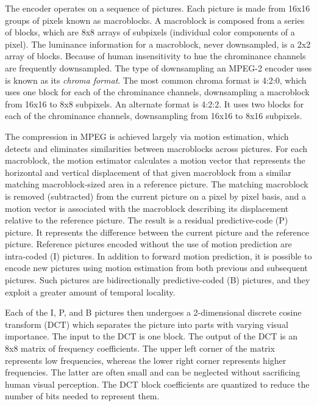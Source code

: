 The encoder operates on a sequence of pictures. Each picture is made
from 16x16 groups of pixels known as macroblocks.  A macroblock
is composed from a series of blocks, which are 8x8 arrays of subpixels
(individual color components of a pixel). The luminance information for
a macroblock, never downsampled, is a 2x2 array of blocks. 
Because of human insensitivity to hue the chrominance channels 
are frequently downsampled. The type of downsampling an MPEG-2 encoder
uses is known as its {\it chroma format}. The most common
chroma format is 4:2:0, which uses one block for each of the
chrominance channels, downsampling a macroblock from 16x16 to 8x8
subpixels. An alternate format is 4:2:2. It uses two blocks for each
of the chrominance channels, downsampling from 16x16 to
8x16 subpixels.

The compression in MPEG is achieved largely via motion estimation,
which detects and eliminates similarities between macroblocks across
pictures. For each macroblock, the motion estimator calculates a motion
vector that represents the horizontal and vertical displacement of that 
given macroblock from a similar matching
macroblock-sized area in a reference picture.  The matching macroblock
is removed (subtracted) from the current picture on a pixel by pixel
basis, and a motion vector is associated with the macroblock
describing its displacement relative to the reference picture. The
result is a residual predictive-code (P) picture. It represents the
difference between the current picture and the reference
picture. Reference pictures encoded without the use of motion
prediction are intra-coded (I) pictures. In addition to forward motion
prediction, it is possible to encode new pictures using motion
estimation from both previous and subsequent pictures. Such pictures
are bidirectionally predictive-coded (B) pictures, and they exploit a
greater amount of temporal locality.

Each of the I, P, and B pictures then undergoes a 2-dimensional
discrete cosine transform (DCT) which separates the picture into parts
with varying visual importance. The input to the DCT is one block.
The output of the
DCT is an 8x8 matrix of frequency coefficients. The upper left corner
of the matrix represents low frequencies, whereas the lower right
corner represents higher frequencies. The latter are often small and
can be neglected without sacrificing human visual perception. The DCT 
block coefficients are quantized to reduce the number of bits needed
to represent them. 

